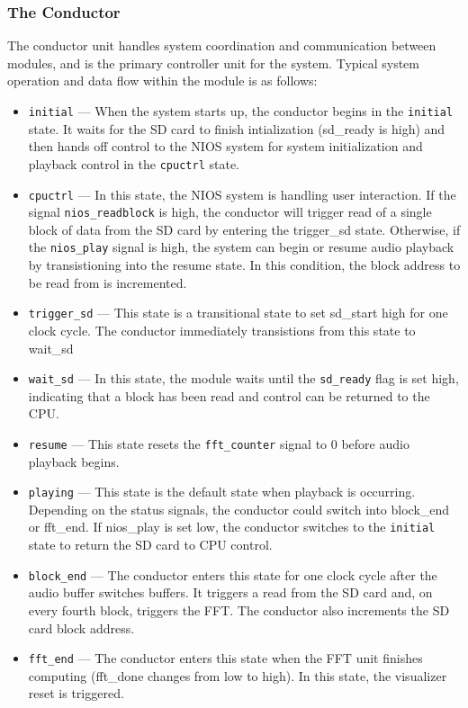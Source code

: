 \documentclass{article}
\begin{document}
\subsubsection{The Conductor}
The conductor unit handles system coordination and communication between modules, and is the primary controller unit for the system. Typical system operation and data flow within the module is as follows:
\begin{itemize}
	\item \texttt{initial} --- When the system starts up, the conductor begins 
		in the \texttt{initial} state. It waits for the SD card to finish 
		intialization (sd\_ready is high) and then hands off control to the NIOS 
		system for system initialization and playback control in the 
		\texttt{cpuctrl} state.
	\item \texttt{cpuctrl} --- In this state, the NIOS system is handling user 
		interaction. If the signal \texttt{nios\_readblock} is high, the 
		conductor will trigger read of a single block of data from the SD card
		by entering the trigger\_sd state. Otherwise, if the \texttt{nios\_play} 
		signal is high, the system can begin or resume audio playback by 
		transistioning into the resume state. In this condition, the block 
		address to be read from is incremented.
	\item \texttt{trigger\_sd} --- This state is a transitional state to set
		sd\_start high for one clock cycle. The conductor immediately 
		transistions from this state to wait\_sd
	\item \texttt{wait\_sd} --- In this state, the module waits until the 
		\texttt{sd\_ready} flag is set high, indicating that a block has been 
		read and control can be returned to the CPU.
	\item \texttt{resume} --- This state resets the \texttt{fft\_counter} 
		signal to 0 before audio playback begins.
	\item \texttt{playing} --- This state is the default state when playback
		is occurring. Depending on the status signals, the conductor could
		switch into block\_end or fft\_end. If nios\_play is set low, the
		conductor switches to the \texttt{initial} state to return the SD card 
		to CPU control.
	\item \texttt{block\_end} --- The conductor enters this state for one
		clock cycle after the audio buffer switches buffers. It triggers a 
		read from the SD card and, on every fourth block, triggers the FFT.
		The conductor also increments the SD card block address.
	\item \texttt{fft\_end} --- The conductor enters this state when the FFT
		unit finishes computing (fft\_done changes from low to high). In this
		state, the visualizer reset is triggered.

\end{itemize}
\end{document}
